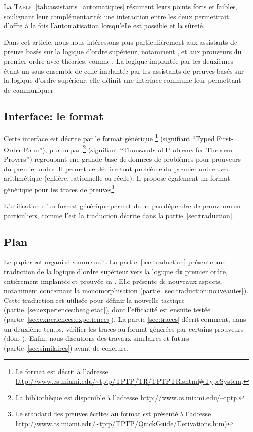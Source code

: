 La \textsc{Table}~\ref{tab:assistants_automatiques} résument leurs
points forts et faibles, soulignant leur complémentarité: une
interaction entre les deux permettrait d'offre à la fois
l'automatisation lorsqu'elle est possible et la sûreté.

Dans cet article, nous nous intéressons plus particulièrement aux
assistants de preuve basés sur la logique d'ordre supérieur, notamment
\holfour, et aux prouveurs du premier ordre avec théories, comme
\beagle. La logique implantée par les deuxièmes étant un sous-ensemble
de celle implantée par les assistants de preuves basés sur la logique
d'ordre supérieur, elle définit une interface commune leur permettant de
communiquer.


\subsection{Interface: le format \tff}

Cette interface est décrite par le format générique \tff\footnote{Le
  format \tff est décrit à l'adresse
  \url{http://www.cs.miami.edu/~tptp/TPTP/TR/TPTPTR.shtml\#TypeSystem}.}
(signifiant ``Typed First-Order Form''), promu par \tptp\footnote{La
  bibliothèque \tptp est disponible à l'adresse
  \url{http://www.cs.miami.edu/~tptp}.} (signifiant ``Thousands of
Problems for Theorem Provers'') regroupant une grande base de données de
problèmes pour prouveurs du premier ordre. Il permet de décrire tout
problème du premier ordre avec arithmétique (entière, rationnelle ou
réelle). Il propose également un format générique pour les traces de
preuves\footnote{Le standard des preuves écrites au format \tff est présenté à l'adresse \url{http://www.cs.miami.edu/~tptp/TPTP/QuickGuide/Derivations.htm})}


L'utilisation d'un format générique permet de ne pas dépendre de
prouveurs en particuliers, comme l'est la traduction décrite dans la
partie~\ref{sec:traduction}.


\subsection{Plan}

Le papier est organisé comme suit. La partie~\ref{sec:traduction}
présente une traduction de la logique d'ordre supérieur vers la logique
du premier ordre, entièrement implantée et prouvée en \holfour. Elle
présente de nouveaux aspects, notamment concernant la monomorphisation
(partie~\ref{sec:traduction:nouveautes}). Cette traduction est utilisée
pour définir la nouvelle tactique \beagletac
(partie~\ref{sec:experiences:beagletac}), dont l'efficacité est ensuite
testée (partie~\ref{sec:experiences:experiences}). La partie
\ref{sec:traces} décrit comment, dans un deuxième temps, vérifier les
traces au format \tff générées par certains prouveurs (dont \beagle).
Enfin, nous discutions des travaux similaires et futurs
(partie~\ref{sec:similaires}) avant de conclure.




